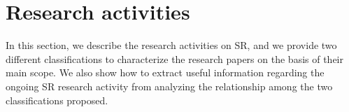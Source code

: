 \section{Research activities}
\label{sec:research}


In this section, we describe the research activities on SR, and we provide two different classifications to characterize the research papers on the basis of their main scope. We also show how to extract useful information regarding the ongoing SR research activity from analyzing the relationship among the two classifications proposed.

